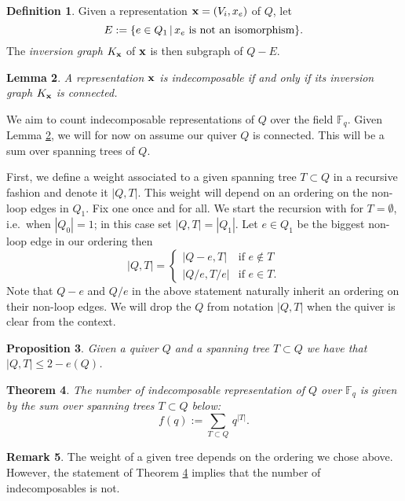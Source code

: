 \documentclass{amsart}
\newtheorem{thm}{Theorem}[section]
\newtheorem{lem}[thm]{Lemma}
\newtheorem{prop}[thm]{Proposition}
\theoremstyle{definition}
\newtheorem{defn}[thm]{Definition}
\newtheorem{rem}[thm]{Remark}
\begin{document}
\begin{defn}
Given a representation $\mathbf{x} = (V_i, x_e)$ of $Q$, let $$E:=\{e\in Q_1 \,|\, x_e \textup{ is not an isomorphism}\}.$$   The {\em inversion graph} $K_{\mathbf{x}}$ of $\mathbf{x}$ is then subgraph of $Q - E$.
\end{defn}

\begin{lem}\label{lm:coninvgr}
A representation $\mathbf{x}$ is indecomposable if and only if its inversion graph $K_{\mathbf{x}}$ is connected.
\end{lem}

We aim to count indecomposable representations of $Q$ over the field $\mathbb{F}_q$.
Given Lemma \ref{lm:coninvgr}, we will for now on assume our quiver $Q$ is connected.
This will be a sum over spanning trees of $Q$.

First, we define a weight associated to a given spanning tree $T \subset Q$ in a recursive fashion and denote it $|Q,T|$.
This weight will depend on an ordering on the non-loop edges in $Q_1$.
Fix one once and for all.
We start the recursion with for $T= \emptyset$, i.e.\ when $|Q_0| =1$; in this case set $|Q,T|=|Q_1|.$
Let $e \in Q_1$ be the biggest non-loop edge in our ordering then
$$|Q,T| = \begin{cases} |Q-e, T| & \text{if } e \notin T \\ |Q/e, T/e| & \text{if } e \in T.\end{cases}
$$
Note that $Q-e$ and $Q/e$ in the above statement naturally inherit an ordering on their non-loop edges.
We will drop the $Q$ from notation $|Q,T|$ when the quiver is clear from the context.

\begin{prop}\label{prop:euler}
Given a quiver $Q$ and a spanning tree $T \subset Q$ we have that $|Q,T| \leq 2-e(Q)$.
\end{prop}

\begin{thm}\label{thm:numindecom}
The number of indecomposable representation of $Q$ over $\mathbb{F}_q$ is given by the sum over spanning trees $T \subset Q$ below: $$f(q):=\sum_{T\subset Q}\, q^{|T|}.$$
\end{thm}

\begin{rem}
The weight of a given tree depends on the ordering we chose above. 
However, the statement of Theorem \ref{thm:numindecom} implies that the number of indecomposables is not.
\end{rem}
\end{document}
